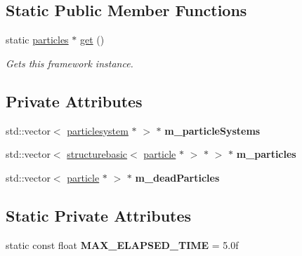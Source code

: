 \subsection*{Static Public Member Functions}
\begin{DoxyCompactItemize}
\item 
static \hyperlink{classflounder_1_1particles}{particles} $\ast$ \hyperlink{classflounder_1_1particles_aa1e98a0a6bf664a5ef5e8a637f5bc195}{get} ()
\begin{DoxyCompactList}\small\item\em Gets this framework instance. \end{DoxyCompactList}\end{DoxyCompactItemize}
\subsection*{Private Attributes}
\begin{DoxyCompactItemize}
\item 
\mbox{\label{classflounder_1_1particles_a13fce1ef2c28a33412d11d25914287cc}} 
std\+::vector$<$ \hyperlink{classflounder_1_1particlesystem}{particlesystem} $\ast$ $>$ $\ast$ {\bfseries m\+\_\+particle\+Systems}
\item 
\mbox{\label{classflounder_1_1particles_a573b879c3466dc74aa720088d346fa77}} 
std\+::vector$<$ \hyperlink{classflounder_1_1structurebasic}{structurebasic}$<$ \hyperlink{classflounder_1_1particle}{particle} $\ast$ $>$ $\ast$ $>$ $\ast$ {\bfseries m\+\_\+particles}
\item 
\mbox{\label{classflounder_1_1particles_afb60841f65a1b95a89c0afe7a580cd33}} 
std\+::vector$<$ \hyperlink{classflounder_1_1particle}{particle} $\ast$ $>$ $\ast$ {\bfseries m\+\_\+dead\+Particles}
\end{DoxyCompactItemize}
\subsection*{Static Private Attributes}
\begin{DoxyCompactItemize}
\item 
\mbox{\label{classflounder_1_1particles_a0bd88dc91a7adc995a6afd2584098ac3}} 
static const float {\bfseries M\+A\+X\+\_\+\+E\+L\+A\+P\+S\+E\+D\+\_\+\+T\+I\+ME} = 5.\+0f
\end{DoxyCompactItemize}


